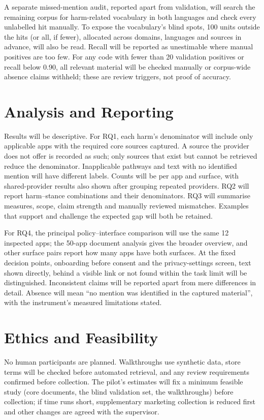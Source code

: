 A separate missed-mention audit, reported apart from validation, will search
the remaining corpus for harm-related vocabulary in both languages and check
every unlabelled hit manually. To expose the vocabulary's blind spots, 100
units outside the hits (or all, if fewer), allocated across domains, languages
and sources in advance, will also be read. Recall will be reported as
unestimable where manual positives are too few. For any code with fewer than
20 validation positives or recall below 0.90, all relevant material will be
checked manually or corpus-wide absence claims withheld; these are review
triggers, not proof of accuracy.

\section{Analysis and Reporting} Results will be descriptive. For RQ1, each harm's denominator
will include only applicable apps with the required core sources captured. A
source the provider does not offer is recorded as such; only sources that
exist but cannot be retrieved reduce the denominator. Inapplicable pathways
and text with no identified mention will have different labels. Counts will be per app and surface, with
shared-provider results also shown after grouping repeated providers.
RQ2 will report harm--stance combinations and their denominators. RQ3 will
summarise measures, scope, claim strength and manually reviewed mismatches.
Examples that support and challenge the expected gap will both be retained.

For RQ4, the principal policy--interface comparison will use the same 12
inspected apps; the 50-app document analysis gives the broader overview, and
other surface pairs report how many apps have both surfaces. At the fixed
decision points, onboarding before consent and the privacy-settings screen,
text shown directly, behind a visible link or not found within the task limit
will be distinguished. Inconsistent claims will be reported apart from mere
differences in detail. Absence will mean \enquote{no mention was identified
in the captured material}, with the instrument's measured limitations stated.

\section{Ethics and Feasibility} No human participants are planned.
Walkthroughs use synthetic data, store terms will be checked before automated
retrieval, and any review requirements confirmed before collection. The
pilot's estimates will fix a minimum feasible study (core documents, the blind
validation set, the walkthroughs) before collection; if time runs short,
supplementary marketing collection is reduced first and other changes are
agreed with the supervisor.

